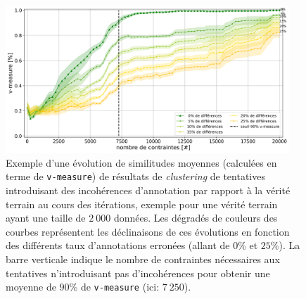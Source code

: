 			\begin{figure}[!htb]
				\centering
				\includegraphics[width=0.95\textwidth]{figures/etude-erreur-simulation-impact-size-2000}
				\caption{
					Exemple d'une évolution de similitudes moyennes (calculées en terme de \texttt{v-measure}) de résultats de \textit{clustering} de tentatives introduisant des incohérences d'annotation par rapport à la vérité terrain au cours des itérations, exemple pour une vérité terrain ayant une taille de $2~000$ données.
					Les dégradés de couleurs des courbes représentent les déclinaisons de ces évolutions en fonction des différents taux d'annotations erronées (allant de $0$\% et $25$\%).
					La barre verticale indique le nombre de contraintes nécessaires aux tentatives n'introduisant pas d'incohérences pour obtenir une moyenne de $90$\% de \texttt{v-measure} (ici: $7~250$).
				}
				\label{figure:4.6.2-ETUDE-ROBUSTESSE-SIMULATION-IMPACT-DIFFERENCES-2000}
			\end{figure}
			
